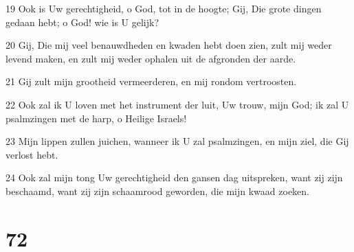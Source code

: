 \par 19 Ook is Uw gerechtigheid, o God, tot in de hoogte; Gij, Die grote dingen gedaan hebt; o God! wie is U gelijk?
\par 20 Gij, Die mij veel benauwdheden en kwaden hebt doen zien, zult mij weder levend maken, en zult mij weder ophalen uit de afgronden der aarde.
\par 21 Gij zult mijn grootheid vermeerderen, en mij rondom vertroosten.
\par 22 Ook zal ik U loven met het instrument der luit, Uw trouw, mijn God; ik zal U psalmzingen met de harp, o Heilige Israels!
\par 23 Mijn lippen zullen juichen, wanneer ik U zal psalmzingen, en mijn ziel, die Gij verlost hebt.
\par 24 Ook zal mijn tong Uw gerechtigheid den gansen dag uitspreken, want zij zijn beschaamd, want zij zijn schaamrood geworden, die mijn kwaad zoeken.

\chapter{72}


